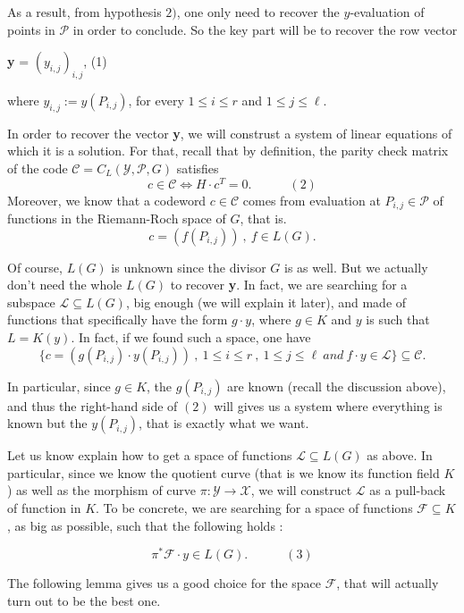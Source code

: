 \documentclass[10pt]{article}
\newcommand{\s}{\vspace{0.3cm}}
\newcommand{\cd}{\cdot}
\newcommand{\su}{\subseteq}
\newcommand{\X}{\mathcal{X}}
\newcommand{\Y}{\mathcal{Y}}
\newcommand{\PR}{\mathcal{P}}
\begin{document}
As a result, from hypothesis $2)$, one only need to recover the $y$-evaluation of points in $\PR$ in order to conclude. So the key part will be to recover the row vector
\begin{center}
\textbf{y} = $(y_{i,j})_{i,j}$, \quad \quad \quad (1)
\end{center}
where $y_{i,j} := y(P_{i,j})$, for every $1 \leq i \leq r$ and $1 \leq j \leq \ell$.

\s

In order to recover the vector \textbf{y}, we will construst a system of linear equations of which it is a solution. For that, recall that by definition, the parity check matrix of the code $\mathcal{C}=C_L(\Y,\PR,G)$ satisfies
\[c \in \mathcal{C} \iff H \cd c^T = 0. \quad \quad \quad (2)\]
Moreover, we know that a codeword $c \in \mathcal{C}$ comes from evaluation at $P_{i,j} \in \PR$ of functions in the Riemann-Roch space of $G$, that is.
\[c = (f(P_{i,j})) \ , \ f \in L(G).\]

Of course, $L(G)$ is unknown since the divisor $G$ is as well. But we actually don't need the whole $L(G)$ to recover \textbf{y}. In fact, we are searching for a subspace $\mathcal{L} \su L(G)$, big enough (we will explain it later), and made of functions that specifically have the form $g \cd y$, where $g \in K$ and $y$ is such that $L=K(y)$. In fact, if we found such a space, one have 
\[\{c= (g(P_{i,j}) \cd y(P_{i,j})) \ , \ 1 \leq i \leq r \ , \ 1 \leq j \leq \ell \ and \ f\cd y \in \mathcal{L}\} \su \mathcal{C}.\] 

In particular, since $g \in K$, the $g(P_{i,j})$ are known (recall the discussion above), and thus the right-hand side of $(2)$ will gives us a system where everything is known but the $y(P_{i,j})$, that is exactly what we want.

\s

Let us know explain how to get a space of functions $\mathcal{L} \su L(G)$ as above. In particular, since we know the quotient curve (that is we know its function field $K$) as well as the morphism of curve $\pi : \Y \rightarrow \X$, we will construct $\mathcal{L}$ as a pull-back of function in $K$. To be concrete, we are searching for a space of functions $\mathcal{F} \su K$, as big as possible, such that the following holds :

\[\pi^*\mathcal{F} \cd y \in L(G). \quad \quad \quad (3)\]

The following lemma gives us a good choice for the space $\mathcal{F}$, that will actually turn out to be the best one.
\end{document}
